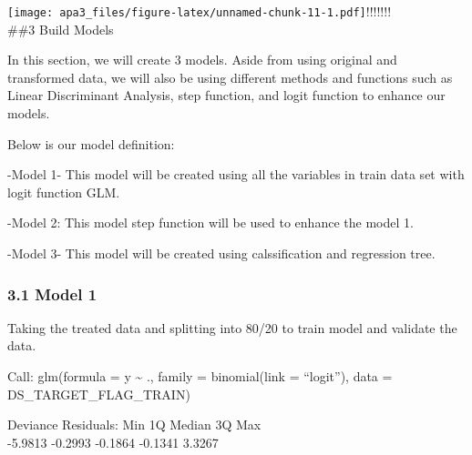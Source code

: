 \documentclass[english,man]{apa6}
\begin{document}
\texttt{[image: apa3\_files/figure-latex/unnamed-chunk-11-1.pdf]}!\href{apa3_files/figure-latex/unnamed-chunk-11-2.pdf}{}!\href{apa3_files/figure-latex/unnamed-chunk-11-3.pdf}{}!\href{apa3_files/figure-latex/unnamed-chunk-11-4.pdf}{}!\href{apa3_files/figure-latex/unnamed-chunk-11-5.pdf}{}!\href{apa3_files/figure-latex/unnamed-chunk-11-6.pdf}{}!\href{apa3_files/figure-latex/unnamed-chunk-11-7.pdf}{}!\href{apa3_files/figure-latex/unnamed-chunk-11-8.pdf}{}\\
 \#\#3 Build Models

In this section, we will create 3 models. Aside from using original and
transformed data, we will also be using different methods and functions
such as Linear Discriminant Analysis, step function, and logit function
to enhance our models.

Below is our model definition:

-Model 1- This model will be created using all the variables in train
data set with logit function GLM.

-Model 2: This model step function will be used to enhance the model 1.

-Model 3- This model will be created using calssification and regression
tree.

\subsubsection{3.1 Model 1}\label{model-1}

Taking the treated data and splitting into 80/20 to train model and
validate the data.

Call: glm(formula = y \textasciitilde{} ., family = binomial(link =
\enquote{logit}), data = DS\_TARGET\_FLAG\_TRAIN)

Deviance Residuals: Min 1Q Median 3Q Max\\
-5.9813 -0.2993 -0.1864 -0.1341 3.3267
\end{document}
